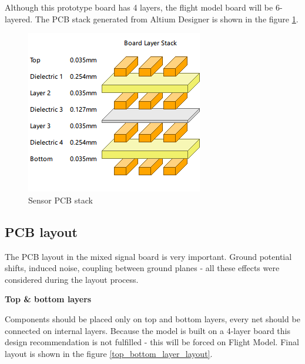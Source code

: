         Although this prototype board has 4 layers, the flight model board will be 6-layered. The PCB stack generated from Altium Designer is shown in the figure \ref{PCB_Altium_stack}.

        \begin{figure}[H]
            \centering
            \includegraphics[width=0.3\paperwidth]{img/06/stack.png}
            \caption{Sensor PCB stack}
            \label{PCB_Altium_stack}
        \end{figure}

    \subsection{PCB layout}
        The PCB layout in the mixed signal board is very important. Ground potential shifts, induced noise, coupling between ground planes - all these effects were considered during the layout process.

        \bigskip \textbf{Top \& bottom layers}

        Components should be placed only on top and bottom layers, every net should be connected on internal layers. Because the model is built on a 4-layer board this design recommendation is not fulfilled - this will be forced on Flight Model. Final layout is shown in the figure \ref{top_bottom_layer_layout}.

